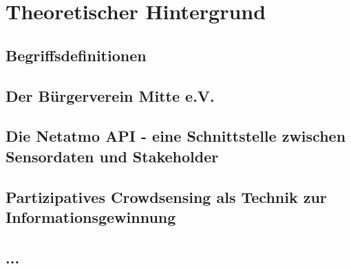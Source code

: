 \chapter{Theoretischer Hintergrund} %

\section{Begriffsdefinitionen}

\section{Der Bürgerverein Mitte e.V.}

\section{Die Netatmo API - eine Schnittstelle zwischen Sensordaten und Stakeholder}

\section{Partizipatives Crowdsensing als Technik zur Informationsgewinnung}

\section{...}